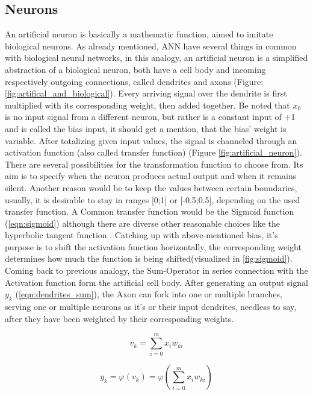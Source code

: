 \subsection{Neurons}
An artificial neuron is basically a mathematic function, aimed to imitate biological neurons.
As already mentioned, ANN have several things in common with biological neural networks, in this analogy, an artificial neuron is a simplified abstraction of a biological neuron, both have a cell body and incoming respectively outgoing connections, called dendrites and axons \cite{nntutorial} (Figure: \ref{fig:artifical_and_biological}). Every arriving signal over the dendrite is first multiplied with its corresponding weight, then added together. Be noted that $x_{0}$ is no input signal from a different neuron, but rather is a constant input of +1 and is called the bias input, it should get a mention, that the bias' weight is variable. \newline
After totalizing given input values, the signal is channeled through an activation function (also called transfer function) (Figure \ref{fig:artificial_neuron}). There are several possibilities for the transformation function to choose from. Its aim is to specify when the neuron produces actual output and when it remains silent. Another reason would be to keep the values between certain boundaries, usually, it is desirable to stay in ranges [0;1] or [-0.5;0.5], depending on the used transfer function. A Common transfer function would be the Sigmoid function (\ref{eqn:sigmoid}) although there are diverse other reasonable choices like the hyperbolic tangent function \cite{nntutorial}. Catching up with above-mentioned bias, it's purpose is to shift the activation function horizontally, the corresponding weight determines how much the function is being shifted(visualized in \ref{fig:sigmoid}). Coming back to previous analogy, the Sum-Operator in series connection with the Activation function form the artificial cell body.\newline 
After generating an output signal $y_{k}$ (\ref{eqn:dendrites_sum}), the Axon can fork into one or multiple branches, serving one or multiple neurons as it's or their input dendrites, needless to say,  after they have been weighted by their corresponding weights.   


\begin{equation}
\label{eqn:vk}
v_{k} = \sum_{i=0}^{m} x_{i} w_{ki}
\end{equation}  

\begin{equation}
\label{eqn:dendrites_sum}
y_{k} = \varphi(v_{k}) = \varphi(\sum_{i=0}^{m} x_{i} w_{ki}) 
\end{equation} 

